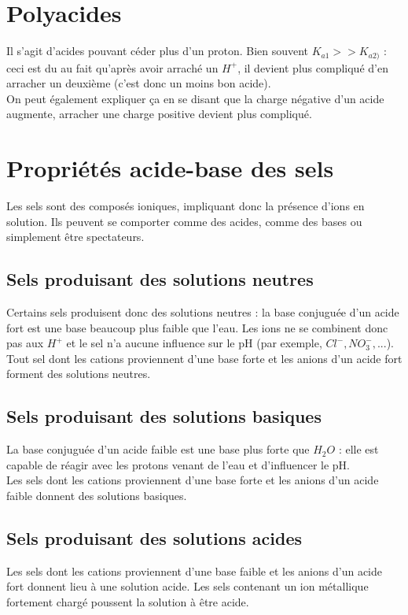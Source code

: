 \documentclass[british,french,11pt, a4paper, openany]{book}
\begin{document}
\section{Polyacides}
Il s'agit d'acides pouvant céder plus d'un proton. Bien souvent $K_{a1} >> K_{a2)}$ : ceci est du au fait qu'après avoir arraché un $H^+$, il devient plus compliqué d'en arracher un deuxième (c'est donc un moins bon acide).\\
On peut également expliquer ça en se disant que la charge négative d'un acide augmente, arracher une charge positive devient plus compliqué.

\section{Propriétés acide-base des sels}
Les sels sont des composés ioniques, impliquant donc la présence d'ions en solution. Ils peuvent se comporter comme des acides, comme des bases ou simplement être spectateurs. \\

\subsection{Sels produisant des solutions neutres}
Certains sels produisent donc des solutions neutres : la base conjuguée d'un acide fort est une base beaucoup plus faible que l'eau. Les ions ne se combinent donc pas aux $H^+$ et le sel n'a aucune influence sur le pH (par exemple, $Cl^-, NO_3^-, ...$).\\
Tout sel dont les cations proviennent d'une base forte et les anions d'un acide fort forment des solutions neutres.

\subsection{Sels produisant des solutions basiques}
La base conjuguée d'un acide faible est une base plus forte que $H_2O$ : elle est capable de réagir avec les protons venant de l'eau et d'influencer le pH.\\
Les sels dont les cations proviennent d'une base forte et les anions d'un acide faible donnent des solutions basiques.

\subsection{Sels produisant des solutions acides}
Les sels dont les cations proviennent d'une base faible et les anions d'un acide fort donnent lieu à une solution acide. Les sels contenant un ion métallique fortement chargé poussent la solution à être acide. 
\end{document}
